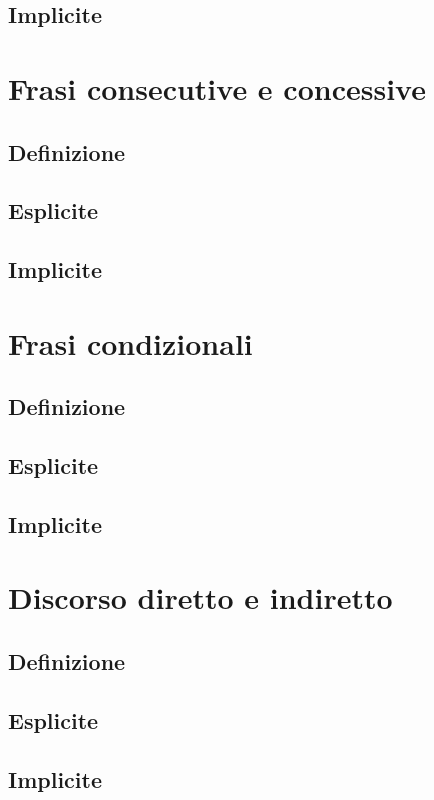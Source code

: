 \documentclass[
  a4paper,
  twoside,
  11pt,
  chapterprefix=false,
  bibliography=totocnumbered,
  listof=flat]{scrbook}
\begin{document}
\hypertarget{implicite-3}{%
\section{Implicite}\label{implicite-3}}

\hypertarget{frasi-consecutive-e-concessive}{%
\chapter{Frasi consecutive e concessive}\label{frasi-consecutive-e-concessive}}

\hypertarget{definizione-3}{%
\section{Definizione}\label{definizione-3}}

\hypertarget{esplicite-4}{%
\section{Esplicite}\label{esplicite-4}}

\hypertarget{implicite-4}{%
\section{Implicite}\label{implicite-4}}

\hypertarget{frasi-condizionali}{%
\chapter{Frasi condizionali}\label{frasi-condizionali}}

\hypertarget{definizione-4}{%
\section{Definizione}\label{definizione-4}}

\hypertarget{esplicite-5}{%
\section{Esplicite}\label{esplicite-5}}

\hypertarget{implicite-5}{%
\section{Implicite}\label{implicite-5}}

\hypertarget{discorso-diretto-e-indiretto}{%
\chapter{Discorso diretto e indiretto}\label{discorso-diretto-e-indiretto}}

\hypertarget{definizione-5}{%
\section{Definizione}\label{definizione-5}}

\hypertarget{esplicite-6}{%
\section{Esplicite}\label{esplicite-6}}

\hypertarget{implicite-6}{%
\section{Implicite}\label{implicite-6}}

\backmatter
  
\end{document}
